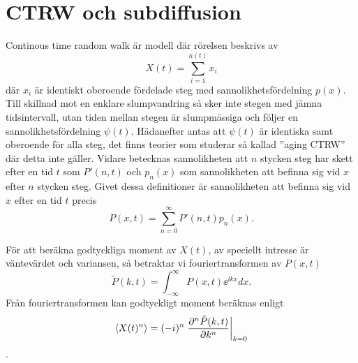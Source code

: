\chapter{CTRW och subdiffusion}
\label{app:CTRW}
Continous time random walk är modell där rörelsen beskrivs av 
\begin{equation}
    X(t) = \sum_{i=1}^{n(t)} x_i
\end{equation}
där $x_i$ är identiskt oberoende fördelade steg med sannolikhetsfördelning $p(x)$. Till skillnad mot en enklare slumpvandring så sker inte stegen med jämna tidsintervall, utan tiden mellan stegen är slumpmässiga och följer en sannolikhetsfördelning $\psi (t)$. Hädanefter antas att $\psi(t)$ är identiska samt oberoende för alla steg, det finns teorier som studerar så kallad ''aging CTRW''\cite{Barkai_ACTRW2002} där detta inte gäller. Vidare betecknas sannolikheten att $n$ stycken steg har skett efter en tid $t$ som $P'(n,t)$ och $p_n(x)$ som sannolikheten att befinna sig vid $x$ efter $n$ stycken steg. Givet dessa definitioner är sannolikheten att befinna sig vid $x$ efter en tid $t$ precis 
\begin{equation}
\label{eq:P(x,t)}
    P(x,t) =\sum_{n=0}^{\infty} P'(n,t)p_n(x).
\end{equation}

För att beräkna godtyckliga moment av $X(t)$, av speciellt intresse är väntevärdet och variansen, så betraktar vi fouriertransformen av $P(x,t)$
\begin{equation}\label{eq:four}
\tilde{P}(k,t) = \int_{-\infty}^{\infty} P(x,t)\ee^{\ii kx}dx.
\end{equation}
Från fouriertransformen kan godtyckligt moment beräknas enligt 
\begin{equation}\label{eq:moment}
\ev{X(t)^n} = (-i)^n \eval{\frac{\pd^n \tilde{P}(k,t)}{\pd k^n}}_{k=0}
\end{equation}. 

